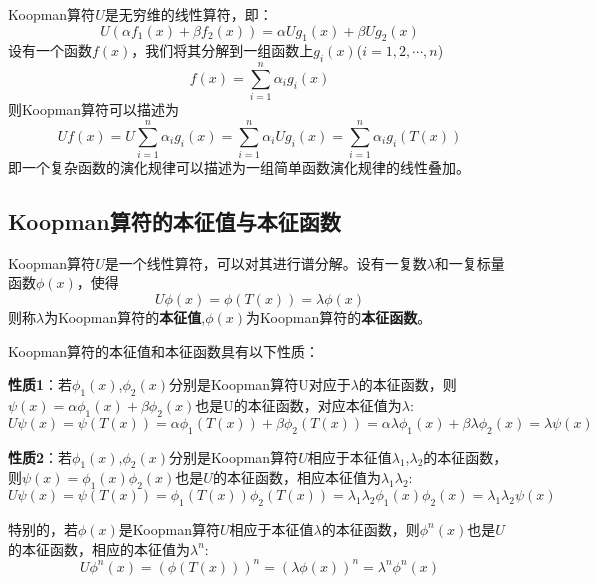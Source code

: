 Koopman算符$U$是无穷维的线性算符，即：
\begin{equation}
    U(\alpha f_1(x)+\beta f_2(x))=\alpha Ug_1(x)+\beta Ug_2(x)
\end{equation}
设有一个函数$f(x)$，我们将其分解到一组函数上$g_i(x)$($i=1,2,\cdots,n$)
\begin{equation}
    f(x)=\sum_{i=1}^n\alpha_ig_i(x)
\end{equation}
则Koopman算符可以描述为
\begin{equation}
    Uf(x)=U\sum_{i=1}^n\alpha_ig_i(x)=\sum_{i=1}^n\alpha_iUg_i(x)=\sum_{i=1}^n\alpha_ig_i(T(x))
\end{equation}
即一个复杂函数的演化规律可以描述为一组简单函数演化规律的线性叠加。

\subsection{Koopman算符的本征值与本征函数}
Koopman算符$U$是一个线性算符，可以对其进行谱分解。设有一复数$\lambda$和一复标量函数$\phi(x)$，使得
\begin{equation}
    U\phi(x)=\phi(T(x))=\lambda\phi(x)
\end{equation}
则称$\lambda$为Koopman算符的\textbf{本征值},$\phi(x)$为Koopman算符的\textbf{本征函数}。

Koopman算符的本征值和本征函数具有以下性质：

\textbf{性质1}：若$\phi_1(x)$,$\phi_2(x)$分别是Koopman算符U对应于$\lambda$的本征函数，则$\psi(x)=\alpha\phi_1(x)+\beta\phi_2(x)$也是U的本征函数，对应本征值为$\lambda$:
\begin{equation}
    U\psi(x)=\psi(T(x))=\alpha\phi_1(T(x))+\beta\phi_2(T(x))=\alpha\lambda\phi_1(x)+\beta
    \lambda\phi_2(x)=\lambda\psi(x)
\end{equation}

\textbf{性质2}：若$\phi_1(x)$,$\phi_2(x)$分别是Koopman算符$U$相应于本征值$\lambda_1$,$\lambda_2$的本征函数，则$\psi(x)=\phi_1(x)\phi_2(x)$也是$U$的本征函数，相应本征值为$\lambda_1\lambda_2$: 
\begin{equation}
U\psi(x)=\psi(T(x))=\phi_1(T(x))\phi_2(T(x))=\lambda_1\lambda_2\phi_1(x)\phi_2(x)=\lambda_1\lambda_2\psi(x)
\end{equation}

特别的，若$\phi(x)$是Koopman算符$U$相应于本征值$\lambda$的本征函数，则$\phi^n(x)$也是$U$的本征函数，相应的本征值为$\lambda^n$:
\begin{equation}
    U\phi^n(x)=(\phi(T(x)))^n=(\lambda\phi(x))^n=\lambda^n\phi^n(x)
\end{equation}

